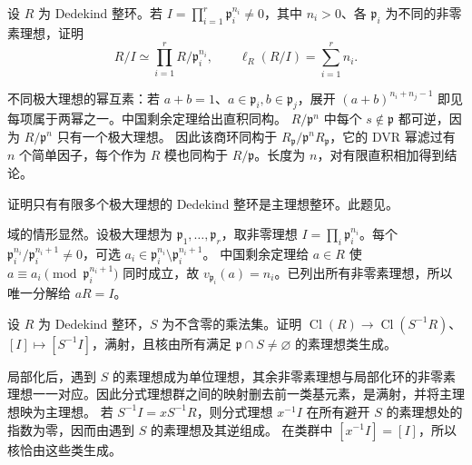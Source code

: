 \begin{exercise}\label{b3:ex:10-dedekind-quotient-length}
	设 \(R\) 为 Dedekind 整环。若 \(I=\prod_{i=1}^r\mathfrak p_i^{n_i}\ne0\)，其中 \(n_i>0\)、各 \(\mathfrak p_i\) 为不同的非零素理想，证明
	\[
		R/I\simeq\prod_{i=1}^rR/\mathfrak p_i^{n_i}, \qquad \ell_R(R/I)=\sum_{i=1}^r n_i.
	\]
\end{exercise}
\begin{solution}
	不同极大理想的幂互素：若 \(a+b=1\)、\(a\in\mathfrak p_i,b\in\mathfrak p_j\)，展开 \((a+b)^{n_i+n_j-1}\) 即见每项属于两幂之一。中国剩余定理给出直积同构。 \(R/\mathfrak p^n\) 中每个 \(s\notin\mathfrak p\) 都可逆，因为 \(R/\mathfrak p^n\) 只有一个极大理想。 因此该商环同构于 \(R_{\mathfrak p}/\mathfrak p^nR_{\mathfrak p}\)，它的 DVR 幂滤过有 \(n\) 个简单因子，每个作为 \(R\) 模也同构于 \(R/\mathfrak p\)。长度为 \(n\)，对有限直积相加得到结论。
\end{solution}

\begin{exercise}\label{b3:ex:10-semilocal-dedekind}
	证明只有有限多个极大理想的 Dedekind 整环是主理想整环。此题见\cite[Exercise 11.7, p. 86]{Matsumura1989CommutativeRingTheory}。
\end{exercise}
\begin{solution}
	域的情形显然。设极大理想为 \(\mathfrak p_1,\ldots,\mathfrak p_r\)，取非零理想 \(I=\prod_i\mathfrak p_i^{n_i}\)。每个 \(\mathfrak p_i^{n_i}/\mathfrak p_i^{n_i+1}\ne0\)，可选 \(a_i\in\mathfrak p_i^{n_i}\setminus\mathfrak p_i^{n_i+1}\)。 中国剩余定理给 \(a\in R\) 使 \(a\equiv a_i\pmod{\mathfrak p_i^{n_i+1}}\) 同时成立，故 \(v_{\mathfrak p_i}(a)=n_i\)。已列出所有非零素理想，所以唯一分解给 \(aR=I\)。
\end{solution}

\begin{exercise}\label{b3:ex:10-localization-class-group}
	设 \(R\) 为 Dedekind 整环，\(S\) 为不含零的乘法集。证明 \(\operatorname{Cl}(R)\rightarrow\operatorname{Cl}(S^{-1}R)\)、\([I]\mapsto[S^{-1}I]\)，满射，且核由所有满足 \(\mathfrak p\cap S\ne\varnothing\) 的素理想类生成。
\end{exercise}
\begin{solution}
	局部化后，遇到 \(S\) 的素理想成为单位理想，其余非零素理想与局部化环的非零素理想一一对应。因此分式理想群之间的映射删去前一类基元素，是满射，并将主理想映为主理想。 若 \(S^{-1}I=xS^{-1}R\)，则分式理想 \(x^{-1}I\) 在所有避开 \(S\) 的素理想处的指数为零，因而由遇到 \(S\) 的素理想及其逆组成。 在类群中 \([x^{-1}I]=[I]\)，所以核恰由这些类生成。
\end{solution}

